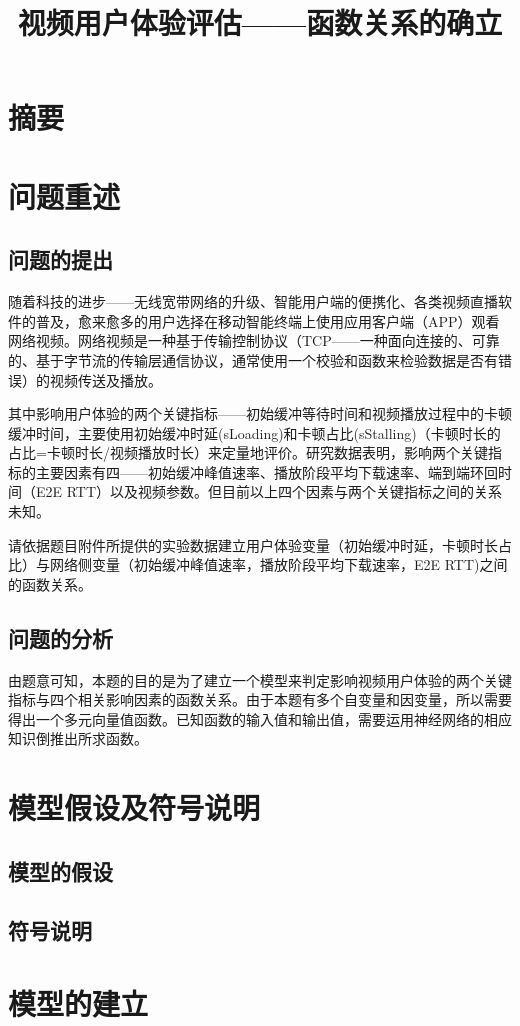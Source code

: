 \documentclass[UTF8]{ctexart}
\title{视频用户体验评估——函数关系的确立}
\begin{document}
\maketitle
\section{摘要}
\section{问题重述}
\subsection{问题的提出}
随着科技的进步——无线宽带网络的升级、智能用户端的便携化、各类视频直播软件的普及，愈来愈多的用户选择在移动智能终端上使用应用客户端（APP）观看网络视频。网络视频是一种基于传输控制协议（TCP——一种面向连接的、可靠的、基于字节流的传输层通信协议，通常使用一个校验和函数来检验数据是否有错误）的视频传送及播放。

其中影响用户体验的两个关键指标——初始缓冲等待时间和视频播放过程中的卡顿缓冲时间，主要使用初始缓冲时延(sLoading)和卡顿占比(sStalling)（卡顿时长的占比=卡顿时长/视频播放时长）来定量地评价。研究数据表明，影响两个关键指标的主要因素有四——初始缓冲峰值速率、播放阶段平均下载速率、端到端环回时间（E2E RTT）以及视频参数。但目前以上四个因素与两个关键指标之间的关系未知。

请依据题目附件所提供的实验数据建立用户体验变量（初始缓冲时延，卡顿时长占比）与网络侧变量（初始缓冲峰值速率，播放阶段平均下载速率，E2E RTT)之间的函数关系。
\subsection{问题的分析}
由题意可知，本题的目的是为了建立一个模型来判定影响视频用户体验的两个关键指标与四个相关影响因素的函数关系。由于本题有多个自变量和因变量，所以需要得出一个多元向量值函数。已知函数的输入值和输出值，需要运用神经网络的相应知识倒推出所求函数。
\section{模型假设及符号说明}
\subsection{模型的假设}
\subsection{符号说明}
\section{模型的建立}
\end{document}
